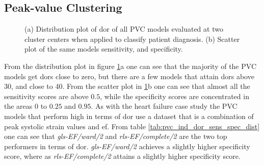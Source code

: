 \clearpage

\subsection{Peak-value Clustering}

\begin{figure}[H]
    \centering
    
    \caption{(a) Distribution plot of \acrshort{dor} of all PVC models evaluated at two cluster centers when applied to classify patient diagnosis.
             (b) Scatter plot of the same models sensitivity, and specificity.}
    \label{fig:pvc_ind_dor_sens_spec_dist}
\end{figure}

From the distribution plot in figure \ref{fig:pvc_ind_dor_sens_spec_dist}a one can see that the majority of the PVC models get \acrshort{dor}s close to zero,
but there are a few models that attain \acrshort{dor}s above 30, and close to 40. 
From the scatter plot in \ref{fig:pvc_ind_dor_sens_spec_dist}b one can see that almost all the sensitivity scores are above $0.5$, while the specificity scores are concentrated
in the areas $0$ to $0.25$ and $0.95$.
As with the heart failure case study the PVC models that perform high in terms of \acrshort{dor} use a dataset that is a combination of peak systolic strain values and \acrshort{ef}.
From table \ref{tab:pvc_ind_dor_sens_spec_dist} one can see that \textit{gls-EF/ward/2} and \textit{rls-EF/complete/2} are the two top performers in terms of \acrshort{dor}. 
\textit{gls-EF/ward/2} achieves a slightly higher specificity score, where as \textit{rls-EF/complete/2} attains a slightly higher specificity score.

